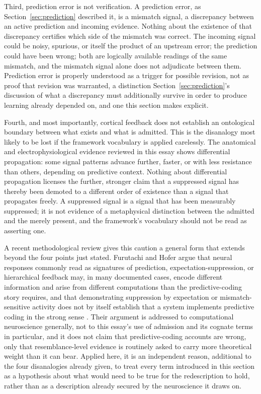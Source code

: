 \documentclass[11pt]{article}
\begin{document}
Third, prediction error is not verification. A prediction error, as Section~\ref{sec:prediction} described it, is a mismatch signal, a discrepancy between an active prediction and incoming evidence. Nothing about the existence of that discrepancy certifies which side of the mismatch was correct. The incoming signal could be noisy, spurious, or itself the product of an upstream error; the prediction could have been wrong; both are logically available readings of the same mismatch, and the mismatch signal alone does not adjudicate between them. Prediction error is properly understood as a trigger for possible revision, not as proof that revision was warranted, a distinction Section~\ref{sec:prediction}'s discussion of what a discrepancy must additionally survive in order to produce learning already depended on, and one this section makes explicit.

Fourth, and most importantly, cortical feedback does not establish an ontological boundary between what exists and what is admitted. This is the disanalogy most likely to be lost if the framework vocabulary is applied carelessly. The anatomical and electrophysiological evidence reviewed in this essay shows differential propagation: some signal patterns advance further, faster, or with less resistance than others, depending on predictive context. Nothing about differential propagation licenses the further, stronger claim that a suppressed signal has thereby been demoted to a different order of existence than a signal that propagates freely. A suppressed signal is a signal that has been measurably suppressed; it is not evidence of a metaphysical distinction between the admitted and the merely present, and the framework's vocabulary should not be read as asserting one.

A recent methodological review gives this caution a general form that extends beyond the four points just stated. Furutachi and Hofer argue that neural responses commonly read as signatures of prediction, expectation-suppression, or hierarchical feedback may, in many documented cases, encode different information and arise from different computations than the predictive-coding story requires, and that demonstrating suppression by expectation or mismatch-sensitive activity does not by itself establish that a system implements predictive coding in the strong sense \citep{FurutachiHofer2026}. Their argument is addressed to computational neuroscience generally, not to this essay's use of admission and its cognate terms in particular, and it does not claim that predictive-coding accounts are wrong, only that resemblance-level evidence is routinely asked to carry more theoretical weight than it can bear. Applied here, it is an independent reason, additional to the four disanalogies already given, to treat every term introduced in this section as a hypothesis about what would need to be true for the redescription to hold, rather than as a description already secured by the neuroscience it draws on.
\end{document}

